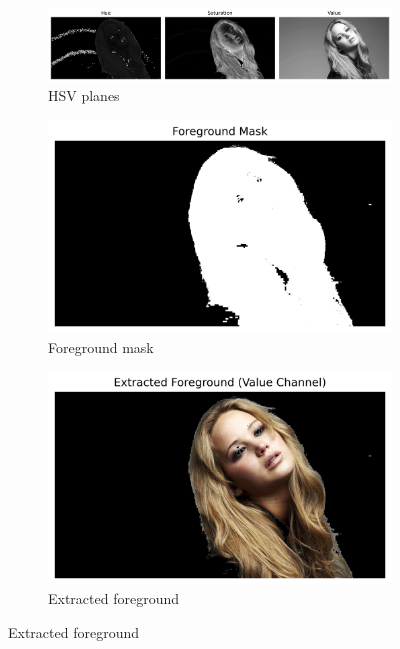 \documentclass[10pt,a4paper]{article}
\begin{document}
\begin{figure}[H]
    \centering
    \begin{subfigure}{0.24\textwidth}
        \includegraphics[width=\textwidth]{task6/1_hsv_planes.png}
        \caption{HSV planes}
    \end{subfigure}
    \begin{subfigure}{0.24\textwidth}
        \includegraphics[width=\textwidth]{task6/2_mask.png}
        \caption{Foreground mask}
    \end{subfigure}
    \begin{subfigure}{0.24\textwidth}
        \includegraphics[width=\textwidth]{task6/3_foreground.png}
        \caption{Extracted foreground}

\end{subfigure}
\end{figure}
\end{document}
